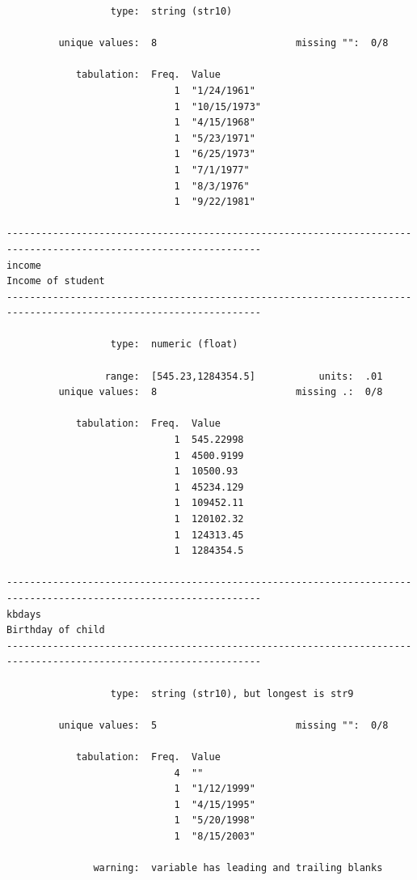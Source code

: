 \documentclass[
]{book}
\begin{document}
\begin{verbatim}
                  type:  string (str10)

         unique values:  8                        missing "":  0/8

            tabulation:  Freq.  Value
                             1  "1/24/1961"
                             1  "10/15/1973"
                             1  "4/15/1968"
                             1  "5/23/1971"
                             1  "6/25/1973"
                             1  "7/1/1977"
                             1  "8/3/1976"
                             1  "9/22/1981"

------------------------------------------------------------------------------------------------------------------
income                                                                                           Income of student
------------------------------------------------------------------------------------------------------------------

                  type:  numeric (float)

                 range:  [545.23,1284354.5]           units:  .01
         unique values:  8                        missing .:  0/8

            tabulation:  Freq.  Value
                             1  545.22998
                             1  4500.9199
                             1  10500.93
                             1  45234.129
                             1  109452.11
                             1  120102.32
                             1  124313.45
                             1  1284354.5

------------------------------------------------------------------------------------------------------------------
kbdays                                                                                           Birthday of child
------------------------------------------------------------------------------------------------------------------

                  type:  string (str10), but longest is str9

         unique values:  5                        missing "":  0/8

            tabulation:  Freq.  Value
                             4  ""
                             1  "1/12/1999"
                             1  "4/15/1995"
                             1  "5/20/1998"
                             1  "8/15/2003"

               warning:  variable has leading and trailing blanks


\end{verbatim}
\end{document}
